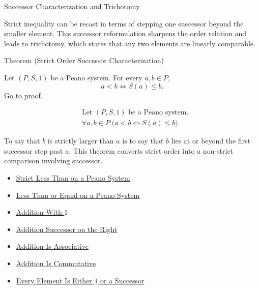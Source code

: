 \begin{topicbox}{Successor Characterization and Trichotomy}
\begin{exposition}
Strict inequality can be recast in terms of stepping one successor beyond the
smaller element. This successor reformulation sharpens the order relation and
leads to trichotomy, which states that any two elements are linearly
comparable.
\end{exposition}

\begin{theorembox}{Theorem (Strict Order Successor Characterization)}
\begin{theorem}
\label{thm:strict-order-successor-characterization}
Let $(P,S,1)$ be a Peano system. For every $a,b \in P$,
\[
a<b
\Longleftrightarrow
S(a) \le b.
\]
\hyperref[prf:strict-order-successor-characterization]{Go to proof.}
\end{theorem}
\end{theorembox}

\begin{remark*}
\[
\begin{aligned}
&\text{Let } (P,S,1) \text{ be a Peano system.}\\
&\forall a,b \in P\;
\bigl(a<b \Longleftrightarrow S(a) \le b\bigr).
\end{aligned}
\]
\end{remark*}

\begin{remark*}[Interpretation]
To say that $b$ is strictly larger than $a$ is to say that $b$ lies at or
beyond the first successor step past $a$. This theorem converts strict order
into a non-strict comparison involving successor.
\end{remark*}

\begin{dependencies}
\begin{itemize}
  \item \hyperref[def:strict-less-than-on-peano-system]{Strict Less Than on a Peano System}
  \item \hyperref[def:less-than-or-equal-on-peano-system]{Less Than or Equal on a Peano System}
  \item \hyperref[thm:addition-with-one]{Addition With $1$}
  \item \hyperref[thm:addition-successor-on-right]{Addition Successor on the Right}
  \item \hyperref[thm:addition-associative]{Addition Is Associative}
  \item \hyperref[thm:addition-commutative]{Addition Is Commutative}
  \item \hyperref[thm:every-element-is-one-or-a-successor]{Every Element Is Either $1$ or a Successor}
\end{itemize}
\end{dependencies}


\end{topicbox}

